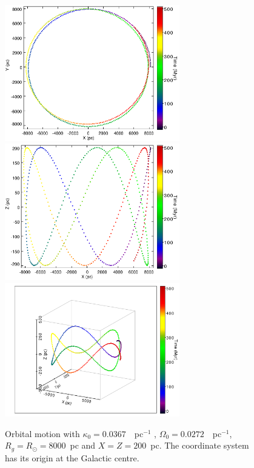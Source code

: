 \begin{figure}[p!] 
\vspace{-2mm}
   \centering
   \includegraphics[width=0.68\textwidth]{orbit_xy}\\ 
   \includegraphics[width=0.68\textwidth]{orbit_xz}\\
   \includegraphics[width=0.68\textwidth]{orbit_xyz} 
   \caption[Orbital motion in the epicyclic approximation]{Orbital motion  with $\kappa_{0}=0.0367$~\kms~pc$^{-1}$ , $\Omega_{0}=0.0272$~\kms~pc$^{-1}$, $R_{g}=R_{\odot}=8000$~pc and $X=Z=200$~pc. The coordinate system has its origin at the Galactic centre.}
   \label{fig:orbit}
\end{figure}

